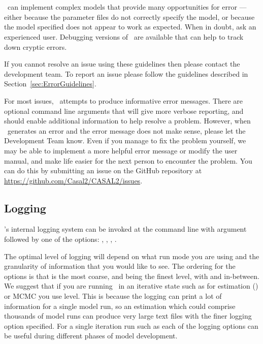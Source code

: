 \section{\label{sec:TroubleShooting}}

\CNAME\ can implement complex models that provide many opportunities for error --- either because the parameter files do not correctly specify the model, or because the model specified does not appear to work as expected. When in doubt, ask an experienced user. Debugging versions of \CNAME\ are available that can help to track down cryptic errors.

If you cannot resolve an issue using these guidelines then please contact the development team. To report an issue please follow the guidelines described in Section~\ref{sec:ErrorGuidelines}.

For most issues, \CNAME\ attempts to produce informative error messages. There are optional command line arguments that will give more verbose reporting, and should enable additional information to help resolve a problem. However, when \CNAME\ generates an error and the error message does not make sense, please let the Development Team know. Even if you manage to fix the problem yourself, we may be able to implement a more helpful error message or modify the user manual, and make life easier for the next person to encounter the problem. You can do this by submitting an issue on the GitHub repository at \url{https://github.com/Casal2/CASAL2/issues}.

\subsection{Logging}\label{sec:TroubleShooting-logging}

\CNAME's internal logging system can be invoked at the command line with argument   followed by one of the options: , , , .

The optimal level of logging will depend on what run mode you are using and the granularity of information that you would like to see. The ordering for the options is that  is the most coarse, and  being the finest level, with  and  in-between. We suggest that if you are running \CNAME\ in an iterative state such as for estimation () or MCMC you use  level. This is because the logging can print a lot of information for a single model run, so an estimation which could comprise thousands of model runs can produce very large text files with the finer logging option specified. For a single iteration run such as  each of the logging options can be useful during different phases of model development.


